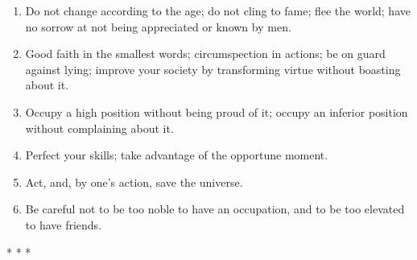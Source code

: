\begin{enumerate}


\item Do not change according to the age; do not cling to fame; flee the world; have no sorrow at not being appreciated or known by men.

\item Good faith in the smallest words; circumspection in actions; be on guard against lying; improve your society by transforming virtue without boasting about it.

\item Occupy a high position without being proud of it; occupy an inferior position without complaining about it.

\item Perfect your skills; take advantage of the opportune moment.

\item Act, and, by one's action, save the universe.

\item Be careful not to be too noble to have an occupation, and to be too elevated to have friends.
\end{enumerate}




\begin{center}* * *\end{center}

